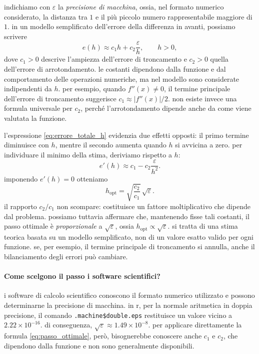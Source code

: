 indichiamo con $\varepsilon$ la \emph{precisione di macchina}, ossia, nel formato numerico considerato, la distanza tra $1$ e il più piccolo numero rappresentabile maggiore di $1$. in un modello semplificato dell'errore della differenza in avanti, possiamo scrivere
\begin{equation}
 e(h)\approx c_1h+c_2\frac{\varepsilon}{h},
 \qquad h>0,
 \label{eq:errore_totale_h}
\end{equation}
dove $c_1>0$ descrive l'ampiezza dell'errore di troncamento e $c_2>0$ quella dell'errore di arrotondamento. le costanti dipendono dalla funzione e dal comportamento delle operazioni numeriche, ma nel modello sono considerate indipendenti da $h$. per esempio, quando $f''(x)\neq0$, il termine principale dell'errore di troncamento suggerisce $c_1\approx |f''(x)|/2$. non esiste invece una formula universale per $c_2$, perché l'arrotondamento dipende anche da come viene valutata la funzione.

l'espressione \eqref{eq:errore_totale_h} evidenzia due effetti opposti: il primo termine diminuisce con $h$, mentre il secondo aumenta quando $h$ si avvicina a zero. per individuare il minimo della stima, deriviamo rispetto a $h$:
\begin{equation*}
 e'(h)\approx c_1-c_2\frac{\varepsilon}{h^2}.
 \label{eq:derivata_errore_totale}
\end{equation*}
imponendo $e'(h)=0$ otteniamo
\begin{equation}
 h_{\mathrm{opt}}=\sqrt{\frac{c_2}{c_1}}\,\sqrt{\varepsilon}.
 \label{eq:passo_ottimale}
\end{equation}
il rapporto $c_2/c_1$ non scompare: costituisce un fattore moltiplicativo che dipende dal problema. possiamo tuttavia affermare che, mantenendo fisse tali costanti, il passo ottimale è \emph{proporzionale} a $\sqrt{\varepsilon}$, ossia $h_{\mathrm{opt}}\propto\sqrt{\varepsilon}$. si tratta di una stima teorica basata su un modello semplificato, non di un valore esatto valido per ogni funzione. se, per esempio, il termine principale di troncamento si annulla, anche il bilanciamento degli errori può cambiare.

\paragraph{Come scelgono il passo i software scientifici?}
i software di calcolo scientifico conoscono il formato numerico utilizzato e possono determinarne la precisione di macchina. in r, per la normale aritmetica in doppia precisione, il comando \texttt{.machine\$double.eps} restituisce un valore vicino a $2.22\times10^{-16}$. di conseguenza, $\sqrt{\varepsilon}\approx1.49\times10^{-8}$. per applicare direttamente la formula \eqref{eq:passo_ottimale}, però, bisognerebbe conoscere anche $c_1$ e $c_2$, che dipendono dalla funzione e non sono generalmente disponibili.

